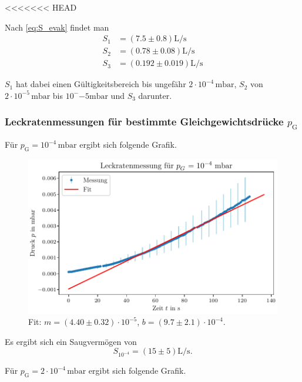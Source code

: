 <<<<<<< HEAD

Nach \eqref{eq:S_evak} findet man
\begin{align}
    S_1 &= (\num{7.5} \pm \num{0.8}) \si{\liter\per\second} \\
    S_2 &= (\num{0.78} \pm \num{0.08}) \si{\liter\per\second} \\
    S_3 &= (\num{0.192} \pm \num{0.019}) \si{\liter\per\second} 
\end{align}

$S_1$ hat dabei einen Gültigkeitsbereich bis ungefähr $\num{2}\cdot 10^{-4} \, \si{\milli\bar}$, $S_2$ von $\num{2}\cdot 10^{-5} \, \si{\milli\bar}$ bis $10^-{-5} \si{\milli\bar}$ und $S_3$ darunter.

\subsubsection{Leckratenmessungen für bestimmte Gleichgewichtsdrücke $p_\text{G}$}

Für $p_\text{G} = 10^{-4} \, \si{\milli\bar}$ ergibt sich folgende Grafik.

\begin{figure}[H]
    \centering
    \includegraphics[width=\textwidth]{plots/TP_Leck_1e4.pdf}
    \caption{Fit: $m = (\num{4.40} \pm \num{0.32}) \cdot 10^{-5}$, $b = (\num{9.7} \pm \num{2.1}) \cdot 10^{-4}$.}
    \label{fig:TP_Leck_1e4}
\end{figure}

Es ergibt sich ein Saugvermögen von
\begin{equation}
    S_{10^{-4}} = (\num{15} \pm \num{5}) \si{\liter\per\second}.
\end{equation}

Für $p_\text{G} = 2 \cdot 10^{-4} \, \si{\milli\bar}$ ergibt sich folgende Grafik.

